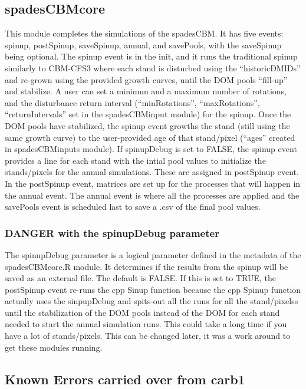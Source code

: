 \documentclass[]{article}
\begin{document}
\subsection{spadesCBMcore}\label{spadescbmcore}

This module completes the simulations of the spadesCBM. It has five
events: spinup, postSpinup, saveSpinup, annual, and savePools, with the
saveSpinup being optional. The spinup event is in the init, and it runs
the traditional spinup similarly to CBM-CFS3 where each stand is
disturbed using the ``historicDMIDs'' and re-grown using the provided
growth curves, until the DOM pools ``fill-up'' and stabilize. A user can
set a minimun and a maximum number of rotations, and the disturbance
return interval (``minRotations'', ``maxRotations'', ``returnIntervals''
set in the spadesCBMinput module) for the spinup. Once the DOM pools
have stabilized, the spinup event growths the stand (still using the
same growth curve) to the user-provided age of that stand/pixel
(``ages'' created in spadesCBMinputs module). If spinupDebug is set to
FALSE, the spinup event provides a line for each stand with the intial
pool values to initialize the stands/pixels for the annual simulations.
These are assigned in postSpinup event. In the postSpinup event,
matrices are set up for the processes that will happen in the annual
event. The annual event is where all the processes are applied and the
savePools event is scheduled last to save a .csv of the final pool
values.

\subsubsection{DANGER with the spinupDebug
parameter}\label{danger-with-the-spinupdebug-parameter}

The spinupDebug parameter is a logical parameter defined in the metadata
of the spadesCBMcore.R module. It determines if the results from the
spinup will be saved as an external file. The default is FALSE. If this
is set to TRUE, the postSpinup event re-runs the cpp Sinup function
because the cpp Spinup function actually uses the sinpupDebug and
spits-out all the runs for all the stand/pixelss until the stabilization
of the DOM pools instead of the DOM for each stand needed to start the
annual simulation runs. This could take a long time if you have a lot of
stands/pixels. This can be changed later, it was a work around to get
these modules running.

\subsection{Known Errors carried over from
carb1}\label{known-errors-carried-over-from-carb1}
\end{document}
